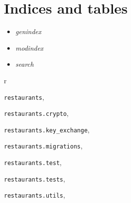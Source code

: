 \documentclass[letterpaper,10pt,english]{sphinxmanual}
\begin{document}
\chapter{Indices and tables}
\label{index:indices-and-tables}\begin{itemize}
\item {} 
\emph{genindex}

\item {} 
\emph{modindex}

\item {} 
\emph{search}

\end{itemize}


\renewcommand{\indexname}{Python Module Index}
\begin{theindex}
\def\bigletter#1{{\Large\sffamily#1}\nopagebreak\vspace{1mm}}
\bigletter{r}
\item {\texttt{restaurants}}, \pageref{restaurants:module-restaurants}
\item {\texttt{restaurants.crypto}}, \pageref{restaurants:module-restaurants.crypto}
\item {\texttt{restaurants.key\_exchange}}, \pageref{restaurants:module-restaurants.key_exchange}
\item {\texttt{restaurants.migrations}}, \pageref{restaurants.migrations:module-restaurants.migrations}
\item {\texttt{restaurants.test}}, \pageref{restaurants:module-restaurants.test}
\item {\texttt{restaurants.tests}}, \pageref{restaurants:module-restaurants.tests}
\item {\texttt{restaurants.utils}}, \pageref{restaurants:module-restaurants.utils}
\end{theindex}

\renewcommand{\indexname}{Index}
\printindex
\end{document}
